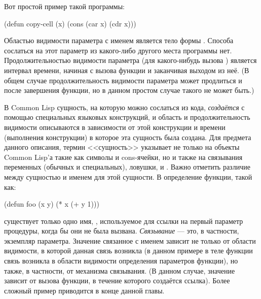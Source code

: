 Вот простой пример такой программы:
\begin{lisp}
(defun copy-cell (x) (cons (car x) (cdr x)))
\end{lisp}

Областью видимости параметра с именем  является тело формы .
Способа сослаться на этот параметр из какого-либо другого места программы
нет. Продолжительностью видимости параметра  (для какого-нибудь вызова
) является интервал времени, начиная с вызова функции и заканчивая
выходом из неё. (В общем случае продолжительность видимости параметра может
продлиться и после завершения функции, но в данном простом случае такого не
может быть.) 

В Common Lisp сущность, на которую можно сослаться из кода, \emph{создаётся} с
помощью специальных языковых конструкций, и область и продолжительность
видимости описываются в зависимости от этой конструкции и времени (выполнения
конструкции) в которое эта сущность была создана.
Для предмета данного описания, термин <<сущность>> указывает не только на
объекты Common Lisp'а такие как символы и cons-ячейки, но и также на связывания
переменных (обычных и специальных), ловушки, и . Важно
отметить различие между сущностью и именем для этой сущности. В определение
функции, такой как:

\begin{lisp}
(defun foo (x y) (* x (+ y 1)))
\end{lisp}

существует только одно имя, , используемое для ссылки на первый параметр
процедуры, когда бы они не была вызвана. \emph{Связывание} --- это, в частности,
экземпляр параметра. Значение связанное с именем  зависит не только от
области видимости, в которой данная связь возникла (в данном примере в теле
функции  связь возникла в области видимости определения параметров
функции), но также, в частности, от механизма связывания. (В данном случае,
значение зависит от вызова функции, в течение которого создаётся ссылка). Более
сложный пример приводится в конце данной главы. 

